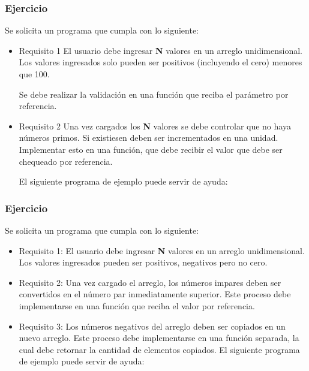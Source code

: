 \subsubsection{Ejercicio}
Se solicita un programa que cumpla con lo siguiente:
\begin{itemize}[a)]
  \item Requisito 1
    El usuario debe ingresar \textbf{N} valores en un arreglo unidimensional. Los valores ingresados solo pueden ser positivos (incluyendo el cero) menores que 100.

    Se debe realizar la validación en una función que reciba el parámetro por referencia.

  \item Requisito 2
    Una vez cargados los \textbf{N} valores se debe controlar que no haya números primos. Si existiesen deben ser incrementados en una unidad. Implementar esto en una función,
    que debe recibir el valor que debe ser chequeado por referencia.

    El siguiente programa de ejemplo puede servir de ayuda:

    \lstset{inputencoding=utf8/latin1}
    
\end{itemize}

\subsubsection{Ejercicio}
Se solicita un programa que cumpla con lo siguiente:
\begin{itemize}[a)]
  \item Requisito 1:
    El usuario debe ingresar \textbf{N} valores en un arreglo unidimensional. Los valores ingresados pueden ser positivos, negativos pero no cero.
  \item Requisito 2:
    Una vez cargado el arreglo, los números impares deben ser convertidos en el número par inmediatamente superior. Este proceso debe implementarse en una función que reciba el valor por referencia.
  \item Requisito 3:
    Los números negativos del arreglo deben ser copiados en un nuevo arreglo. Este proceso debe implementarse en una función separada, la cual debe retornar la cantidad de elementos copiados.
    El siguiente programa de ejemplo puede servir de ayuda:

    \lstset{inputencoding=utf8/latin1}
    
\end{itemize}

